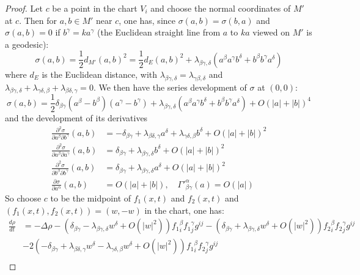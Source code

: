 \begin{proof}
Let \(c\) be a point in the chart \(V_i\) and choose the normal coordinates of \(M'\) at \(c\). Then for \(a,b\in M'\) near \(c\), one has, since \(\sigma(a,b) =
\sigma(b,a)\) and \(\sigma(a,b)=0\) if \(b^\gamma = k a^\gamma\) (the Euclidean
straight line from \(a\) to \(ka\) viewed on \(M'\) is a geodesic):
\[
 \sigma(a,b) = \frac{1}{2}d_{M'}(a,b)^2 = \frac{1}{2}d_E(a,b)^2 +
\lambda_{\beta\gamma,\delta}(a^\beta a^\gamma b^\delta + b^\beta b^\gamma a^\delta)
\]
where \(d_E\) is the Euclidean distance, with \(\lambda_{\beta\gamma,\delta} =
\lambda_{\gamma\beta,\delta}\) and \(\lambda_{\beta\gamma,\delta}
+\lambda_{\gamma\delta,\beta} + \lambda_{\beta\delta,\gamma}= 0\). We then have the
series development of \(\sigma\) at \((0,0)\):
\begin{equation}
\label{eq:dev-sig-unique}
\sigma(a,b) = \frac{1}{2}\delta_{\beta\gamma} (a^\beta - b^\beta)(a^\gamma - b^\gamma) +
\lambda_{\beta\gamma,\delta} (a^\beta a^\gamma b^\delta + b^\beta b^\gamma a^\delta) + O(|a|+|b|)^4
\end{equation}
and the development of its derivatives
\begin{align*}
  \frac{\partial^2 \sigma}{\partial a^\beta \partial b^\gamma}(a,b) &= -\delta_{\beta\gamma} + \lambda_{\beta\delta,\gamma}a^\delta + \lambda_{\gamma\delta,\beta}b^\delta + O(|a|+|b|)^2\\
  \frac{\partial^2 \sigma}{\partial a^\beta \partial a^\gamma}(a,b) &= \delta_{\beta\gamma} + \lambda_{\beta\gamma,\delta}b^\delta + O(|a|+|b|)^2\\
  \frac{\partial^2 \sigma}{\partial b^\beta \partial b^\gamma}(a,b) &= \delta_{\beta\gamma} + \lambda_{\beta\gamma,\delta}a^\delta + O(|a|+|b|)^2\\
   \frac{\partial\sigma}{\partial a^\alpha}(a,b) &= O(|a|+|b|),\quad {\Gamma'}^\alpha_{\beta\gamma}(a) = O(|a|)
\end{align*}
So choose \(c\) to be the midpoint of \(f_1(x,t)\) and \(f_2(x,t)\) and \((f_1(x,t),
f_2(x,t)) = (w,-w)\) in the chart, one has:
\begin{align}
 \frac{d\rho}{d t} &= -\Delta\rho - \left( \delta_{\beta\gamma} -\lambda_{\beta\gamma,\delta}w^\delta + O(|w|^2)  \right) {f_1}^\beta_i {f_1}^\gamma_j g^{ij}   - \left( \delta_{\beta\gamma} + \lambda_{\beta\gamma,\delta} w^\delta + O(|w|^2)\right) {f_2}^\beta_i {f_2}^\gamma_j g^{ij}  \label{eq:sym-red-beta-before}\\
		   & - 2\left( -\delta_{\beta\gamma} + \lambda_{\beta\delta,\gamma}w^\delta - \lambda_{\gamma\delta,\beta} w^\delta + O(|w|^2)  \right) {f_1}^\beta_i {f_2}^\gamma_j g^{ij} \label{eq:sym-red-beta}\\

\end{align}
\end{proof}
